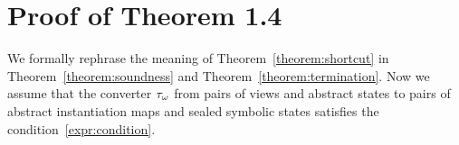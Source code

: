 \section{Proof of Theorem 1.4}\label{sec:proof}

We formally rephrase the meaning of Theorem~\ref{theorem:shortcut} in
Theorem~\ref{theorem:soundness} and Theorem~\ref{theorem:termination}.
Now we assume that the converter ${\tau}_\omega$ from pairs of views and abstract states
to pairs of abstract instantiation maps and sealed symbolic states satisfies the
condition~\ref{expr:condition}.

\begin{theorem}[Soundness]\label{theorem:soundness}
\end{theorem}

\begin{theorem}[Termination]\label{theorem:termination}
\end{theorem}


